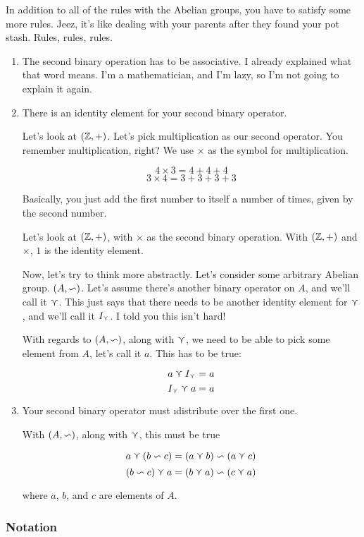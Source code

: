 In addition to all of the rules with the Abelian groups, you have to satisfy
some more rules. Jeez, it's like dealing with your parents after they found your
pot stash. Rules, rules, rules.

\begin{enumerate}
\item The second binary operation has to be associative. I already explained
  what that word means. I'm a mathematician, and I'm lazy, so I'm not going to
  explain it again.

\item There is an identity element for your second binary operator. 

  Let's look at $(\Z, +)$. Let's pick multiplication as our second operator. You
  remember multiplication, right? We use $\times$ as the symbol for
  multiplication.

  \[ 4 \times 3 = 4 + 4 + 4 \]
  \[ 3 \times 4 = 3 + 3 + 3 + 3 \]
  
  Basically, you just add the first number to itself a number of times, given by
  the second number.
  
  Let's look at $(\Z, +)$, with $\times$ as the second binary operation. With
  $(\Z, +)$ and $\times$, $1$ is the identity element.
  
  Now, let's try to think more abstractly. Let's consider some arbitrary Abelian
  group. $(A, \~)$. Let's assume there's another binary operator on $A$, and
  we'll call it $\v$. This just says that there needs to be another identity
  element for $\v$, and we'll call it $I_\v$. I told you this isn't hard!

  With regards to $(A, \~)$, along with $\v$, we need to be able to pick some
  element from $A$, let's call it $a$. This has to be true:

  \[ a \v I_\v = a\]
  \[ I_\v \v a = a\]
  
\item Your second binary operator must \i{distribute} over the first one.
  
  With $(A, \~)$, along with $\v$, this must be true

  \[a \v (b \~ c) = (a \v b) \~ (a \v c)\]
  \[(b \~ c) \v a = (b \v a) \~ (c \v a)\]
  
  where $a$, $b$, and $c$ are elements of $A$.
  
\end{enumerate}

\subsubsection{Notation}

